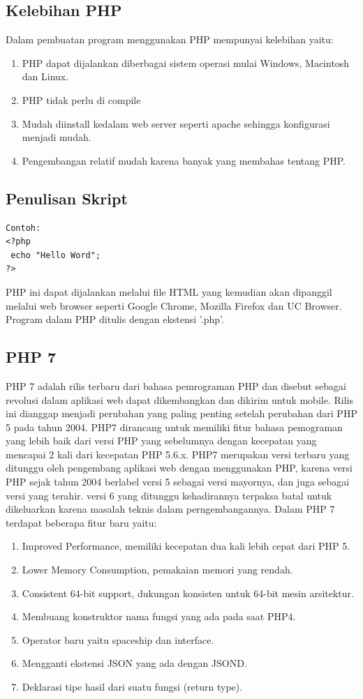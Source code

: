 \subsection{Kelebihan PHP}
Dalam pembuatan program menggunakan PHP mempunyai kelebihan yaitu:
\begin{enumerate}
\item PHP dapat dijalankan diberbagai sistem operasi mulai Windows, Macintosh dan Linux.
\item PHP tidak perlu di compile
\item Mudah diinstall kedalam web server seperti apache sehingga konfigurasi menjadi mudah.
\item Pengembangan relatif mudah karena banyak yang membahas tentang PHP.
\end{enumerate}

\subsection{Penulisan Skript}
\begin{lstlisting}
Contoh:
<?php
 echo "Hello Word";
?>
\end{lstlisting}
PHP ini dapat dijalankan melalui file HTML yang kemudian akan dipanggil melalui web browser seperti Google Chrome, Mozilla Firefox dan UC Browser.
Program dalam PHP ditulis dengan ekstensi '.php'.

\subsection{PHP 7}
PHP 7 adalah rilis terbaru dari bahasa pemrograman PHP dan disebut sebagai revolusi dalam aplikasi web dapat dikembangkan dan dikirim untuk mobile. Rilis ini dianggap menjadi perubahan yang paling penting setelah perubahan dari PHP 5 pada tahun 2004. PHP7 dirancang untuk memiliki fitur bahasa pemograman yang lebih baik dari versi PHP yang sebelumnya dengan kecepatan yang mencapai 2 kali dari kecepatan PHP 5.6.x. PHP7 merupakan versi terbaru yang ditunggu oleh pengembang aplikasi web dengan menggunakan PHP, karena versi PHP sejak tahun 2004 berlabel versi 5 sebagai versi mayornya, dan juga sebagai versi yang terahir. versi 6 yang ditunggu kehadirannya terpaksa batal untuk dikeluarkan karena masalah teknis dalam perngembangannya.
Dalam PHP 7 terdapat beberapa fitur baru yaitu:
\begin{enumerate}
\item Improved Performance, memiliki kecepatan dua kali lebih cepat dari PHP 5.
\item Lower Memory Consumption, pemakaian memori yang rendah.
\item Consistent 64-bit support, dukungan konsisten untuk 64-bit mesin arsitektur.
\item Membuang konstruktor nama fungsi yang ada pada saat PHP4.
\item Operator baru yaitu spaceship dan interface.
\item Mengganti ekstensi JSON yang ada dengan JSOND.
\item Deklarasi tipe hasil dari suatu fungsi (return type).
\end {enumerate}

